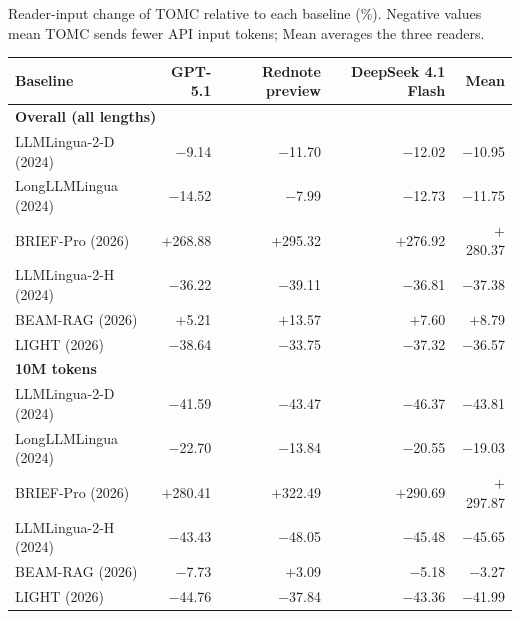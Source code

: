 \documentclass[border=10pt]{standalone}
\begin{document}
\begin{minipage}{4.6in}

Reader-input change of TOMC relative to each baseline (\%). Negative values mean TOMC sends fewer API input tokens; Mean averages the three readers.\par\medskip
{\small\setlength{\tabcolsep}{1pt}\renewcommand{\arraystretch}{1.12}
\begin{tabular*}{\linewidth}{@{\extracolsep{\fill}}lrrrr@{}}
\toprule
Baseline & GPT-5.1 & Rednote preview & DeepSeek 4.1 Flash & Mean \\
\midrule
\multicolumn{5}{l}{\textbf{Overall (all lengths)}}\\
LLMLingua-2-D (2024) & $-$9.14 & $-$11.70 & $-$12.02 & $-$10.95 \\
LongLLMLingua (2024) & $-$14.52 & $-$7.99 & $-$12.73 & $-$11.75 \\
BRIEF-Pro (2026) & $+$268.88 & $+$295.32 & $+$276.92 & $+$280.37 \\
LLMLingua-2-H (2024) & $-$36.22 & $-$39.11 & $-$36.81 & $-$37.38 \\
BEAM-RAG (2026) & $+$5.21 & $+$13.57 & $+$7.60 & $+$8.79 \\
LIGHT (2026) & $-$38.64 & $-$33.75 & $-$37.32 & $-$36.57 \\
\midrule
\multicolumn{5}{l}{\textbf{10M tokens}}\\
LLMLingua-2-D (2024) & $-$41.59 & $-$43.47 & $-$46.37 & $-$43.81 \\
LongLLMLingua (2024) & $-$22.70 & $-$13.84 & $-$20.55 & $-$19.03 \\
BRIEF-Pro (2026) & $+$280.41 & $+$322.49 & $+$290.69 & $+$297.87 \\
LLMLingua-2-H (2024) & $-$43.43 & $-$48.05 & $-$45.48 & $-$45.65 \\
BEAM-RAG (2026) & $-$7.73 & $+$3.09 & $-$5.18 & $-$3.27 \\
LIGHT (2026) & $-$44.76 & $-$37.84 & $-$43.36 & $-$41.99 \\
\bottomrule
\end{tabular*}}
\par{}
\end{minipage}
\end{document}
